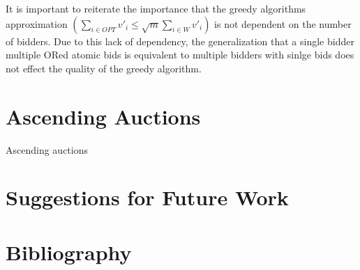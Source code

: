 \documentclass[10pt,onecolumn,letterpaper]{article}
\theoremstyle{definition}
\begin{document}
It is important to reiterate the importance that the greedy algorithms approximation $(\sum_{i \in OPT} v'_i \leq \sqrt{m} \sum_{i \in W} v'_i)$ is not dependent on the number of bidders. Due to this lack of dependency, the generalization that a single bidder multiple ORed atomic bids is equivalent to multiple bidders with sinlge bids does not effect the quality of the greedy algorithm.

\section{Ascending Auctions} %

Ascending auctions 

\section{Suggestions for Future Work} %



\section{Bibliography} %
\end{document}
